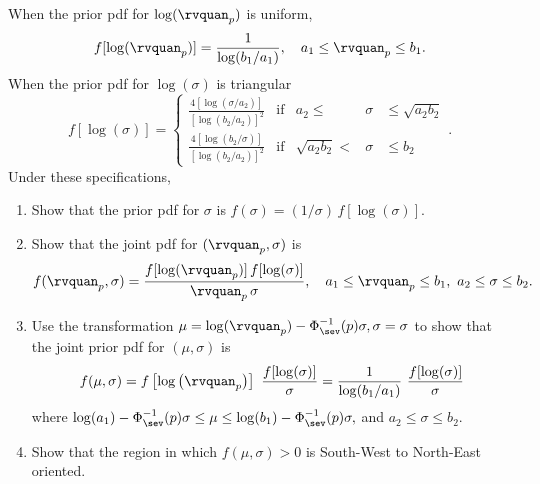 \begin{exercise1}
\label{exercise:alt.prior.bcage}
When the prior pdf for $\log(\rvquan_{p})$ is uniform,
\begin{displaymath}
f[\log(\rvquan_{p})]=\frac{1}{\log(b_{1}/a_{1})}, \quad 
a_{1} \le \rvquan_{p} \le b_{1}.
\end{displaymath}
When the prior pdf for $\log(\sigma)$ is triangular
\begin{displaymath}
f[\log(\sigma)]=
\left \{
\begin{array}{lcrcl}
\frac{4[\log(\sigma/a_{2})]}
     { [\log(b_{2}/a_{2})]^{2}}& \mbox{if}& a_{2} \le& \sigma &\le \sqrt{a_{2} b_{2}}
\\[1ex]
\frac{4[\log(b_{2}/\sigma)]}
     {[\log(b_{2}/a_{2})]^{2}}& \mbox{if}& \sqrt{a_{2} b_{2}} < & \sigma &\le  b_{2}
\end{array}.
\right.
\end{displaymath}
Under these specifications, 
\begin{enumerate}
\item
Show that the prior pdf for $\sigma$ is
$
f(\sigma)=(1/\sigma) \, f[\log(\sigma)].
$
\item
Show that the joint pdf for $(\rvquan_{p}, \sigma)$ is
\begin{displaymath}
f(\rvquan_{p}, \sigma)=
\frac{f[\log(\rvquan_{p})]\, f[\log(\sigma)]}{\rvquan_{p}\, \sigma},
\quad 
a_{1} \le \rvquan_{p} \le b_{1}, \,\, a_{2} \le \sigma \le  b_{2}.
\end{displaymath}
\item
Use the transformation $\mu=\log(\rvquan_{p})-\Phi^{-1}_{\sev}(p) \sigma, \sigma=\sigma$
to show that the joint prior pdf for
$(\mu, \sigma)$ is
\begin{displaymath}
f(\mu, \sigma) = f\left [\log \left (\rvquan_{p}\right ) \right ]\, \,\frac{
 f[\log(\sigma)]}{ \sigma}=
\frac{1}{\log(b_{1}/a_{1})}\, \, \frac{
 f[\log(\sigma)]}{ \sigma}
\end{displaymath}
where 
$
\log(a_{1})-\Phi^{-1}_{\sev}(p) \sigma \le   \mu   \le \log(b_{1})-\Phi^{-1}_{\sev}(p) \sigma,
$
and
$
a_{2} \le   \sigma \le  b_{2}.
$
\item
Show that the region in which $f(\mu, \sigma)>0$
is South-West to North-East oriented.
\end{enumerate}
\end{exercise1}

